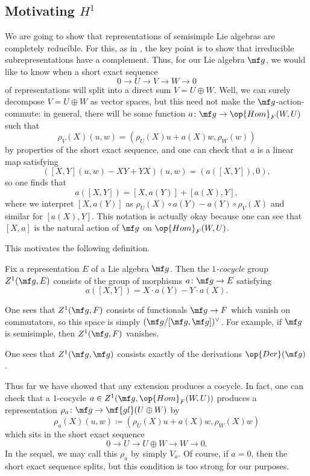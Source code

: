 \documentclass[../notes.tex]{subfiles}
\begin{document}
\subsection{Motivating \texorpdfstring{$H^1$}{ H1}}
We are going to show that representations of semisimple Lie algebras are completely reducible. For this, as in , the key point is to show that irreducible subrepresentations have a complement. Thus, for our Lie algebra $\mf g$, we would like to know when a short exact sequence
\[0\to U\to V\to W\to0\]
of representations will split into a direct sum $V=U\oplus W$. Well, we can surely decompose $V=U\oplus W$ as vector spaces, but this need not make the $\mf g$-action-commute: in general, there will be some function $a\colon\mf g\to\op{Hom}_F(W,U)$ such that
\[\rho_V(X)(u,w)=(\rho_U(X)u+a(X)w,\rho_W(w))\]
by properties of the short exact sequence, and one can check that $a$ is a linear map satisfying
\[([X,Y](u,w)-XY+YX)(u,w)=(a([X,Y]),0),\]
so one finds that
\[a([X,Y])=[X,a(Y)]+[a(X),Y],\]
where we interpret $[X,a(Y)]$ as $\rho_U(X)\circ a(Y)-a(Y)\circ\rho_V(X)$ and similar for $[a(X),Y]$. This notation is actually okay because one can see that $[X,a]$ is the natural action of $\mf g$ on $\op{Hom}_F(W,U)$.

This motivates the following definition.
\begin{defihelper}[$Z^1(\mf g,E)$] 
	Fix a representation $E$ of a Lie algebra $\mf g$. Then the \textit{$1$-cocycle} group $Z^1(\mf g,E)$ consists of the group of morphisms $a\colon\mf g\to E$ satisfying
	\[a([X,Y])=X\cdot a(Y)-Y\cdot a(X).\]
\end{defihelper}
\begin{example}
	One sees that $Z^1(\mf g,F)$ consists of functionals $\mf g\to F$ which vanish on commutators, so this space is simply $(\mf g/[\mf g,\mf g])^\lor$. For example, if $\mf g$ is semisimple, then $Z^1(\mf g,F)$ vanishes.
\end{example}
\begin{example}
	One sees that $Z^1(\mf g,\mf g)$ consists exactly of the derivations $\op{Der}(\mf g)$.
\end{example}
Thus far we have showed that any extension produces a cocycle. In fact, one can check that a $1$-cocycle $a\in Z^1(\mf g,\op{Hom}_F(W,U))$ produces a representation $\rho_a\colon\mf g\to\mf{gl}(U\oplus W)$ by
\[\rho_a(X)(u,w)\coloneqq(\rho_U(X)u+a(X)w,\rho_W(X)w)\]
which sits in the short exact sequence
\[0\to U\to U\oplus W\to W\to0.\]
In the sequel, we may call this $\rho_a$ by simply $V_a$. Of course, if $a=0$, then the short exact sequence splits, but this condition is too strong for our purposes.
\end{document}
